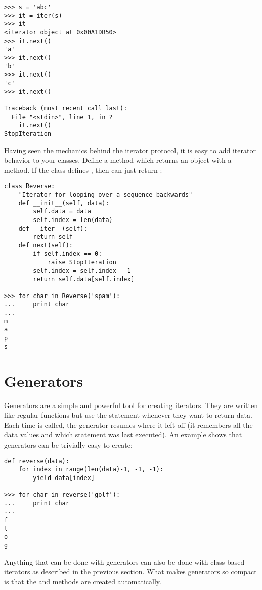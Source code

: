\documentclass{manual}
\begin{document}
\begin{verbatim}
>>> s = 'abc'
>>> it = iter(s)
>>> it
<iterator object at 0x00A1DB50>
>>> it.next()
'a'
>>> it.next()
'b'
>>> it.next()
'c'
>>> it.next()

Traceback (most recent call last):
  File "<stdin>", line 1, in ?
    it.next()
StopIteration
\end{verbatim}

Having seen the mechanics behind the iterator protocol, it is easy to add
iterator behavior to your classes.  Define a  method
which returns an object with a  method.  If the class defines
, then  can just return :

\begin{verbatim}
class Reverse:
    "Iterator for looping over a sequence backwards"
    def __init__(self, data):
        self.data = data
        self.index = len(data)
    def __iter__(self):
        return self
    def next(self):
        if self.index == 0:
            raise StopIteration
        self.index = self.index - 1
        return self.data[self.index]

>>> for char in Reverse('spam'):
...     print char
...
m
a
p
s
\end{verbatim}


\section{Generators\label{generators}}

Generators are a simple and powerful tool for creating iterators.  They are
written like regular functions but use the  statement whenever
they want to return data.  Each time  is called, the
generator resumes where it left-off (it remembers all the data values and
which statement was last executed).  An example shows that generators can
be trivially easy to create:

\begin{verbatim}
def reverse(data):
    for index in range(len(data)-1, -1, -1):
        yield data[index]
	
>>> for char in reverse('golf'):
...     print char
...
f
l
o
g	
\end{verbatim}

Anything that can be done with generators can also be done with class based
iterators as described in the previous section.  What makes generators so
compact is that the  and  methods are
created automatically.
\end{document}
